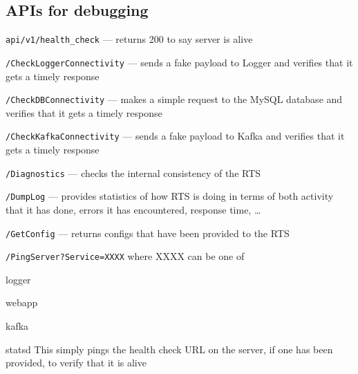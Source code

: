 \documentclass[letterpaper]{article}
\begin{document}
\subsection{APIs for debugging}

\be
\item {\tt api/v1/health\_check} --- returns 200 to say server is alive
\item {\tt /CheckLoggerConnectivity} --- sends a fake payload to Logger and
  verifies that it gets a timely response
\item {\tt /CheckDBConnectivity} --- makes a simple request to the MySQL
  database and verifies that it gets a timely response
\item {\tt /CheckKafkaConnectivity} --- sends a fake payload to Kafka and
  verifies that it gets a timely response
\item {\tt /Diagnostics} --- checks the internal consistency of the RTS
\item {\tt /DumpLog} --- provides statistics of how RTS is doing in terms of
  both activity that it has done, errors it has encountered, response time,
  \ldots
\item {\tt /GetConfig} --- returns configs that have been provided to the
  RTS
\item {\tt /PingServer?Service=XXXX} where XXXX can be one of 
  \be
\item logger
\item webapp
\item kafka 
\item statsd 
  \ee
  This simply pings the health check URL on the server, if one has been
  provided, to verify that it is alive
  \ee
\end{document}
